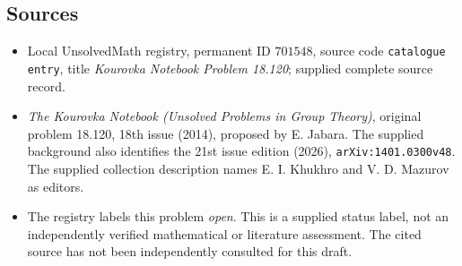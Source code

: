 \documentclass[11pt]{article}
\begin{document}
\subsection{Sources}
\begin{itemize}
\item Local UnsolvedMath registry, permanent ID \(701548\), source code \texttt{catalogue entry}, title \emph{Kourovka Notebook Problem 18.120}; supplied complete source record.
\item \emph{The Kourovka Notebook (Unsolved Problems in Group Theory)}, original problem 18.120, 18th issue (2014), proposed by E. Jabara. The supplied background also identifies the 21st issue edition (2026), \texttt{arXiv:1401.0300v48}. The supplied collection description names E. I. Khukhro and V. D. Mazurov as editors.
\item The registry labels this problem \emph{open}. This is a supplied status label, not an independently verified mathematical or literature assessment. The cited source has not been independently consulted for this draft.
\end{itemize}
\end{document}
